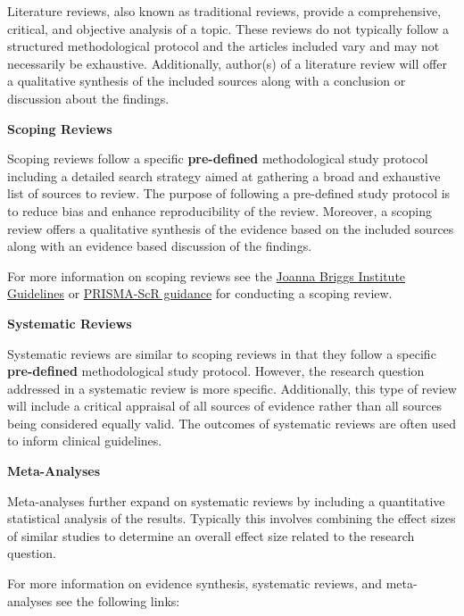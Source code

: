 \documentclass[
]{book}
\begin{document}
Literature reviews, also known as traditional reviews, provide a comprehensive, critical, and objective analysis of a topic. These reviews do not typically follow a structured methodological protocol and the articles included vary and may not necessarily be exhaustive. Additionally, author(s) of a literature review will offer a qualitative synthesis of the included sources along with a conclusion or discussion about the findings.

\textbf{Scoping Reviews}

Scoping reviews follow a specific \textbf{pre-defined} methodological study protocol including a detailed search strategy aimed at gathering a broad and exhaustive list of sources to review. The purpose of following a pre-defined study protocol is to reduce bias and enhance reproducibility of the review. Moreover, a scoping review offers a qualitative synthesis of the evidence based on the included sources along with an evidence based discussion of the findings.

For more information on scoping reviews see the \href{https://jbi-global-wiki.refined.site/space/MANUAL/4687342/Chapter+11\%3A+Scoping+reviews}{Joanna Briggs Institute Guidelines} or \href{https://www.prisma-statement.org/scoping}{PRISMA-ScR guidance} for conducting a scoping review.

\textbf{Systematic Reviews}

Systematic reviews are similar to scoping reviews in that they follow a specific \textbf{pre-defined} methodological study protocol. However, the research question addressed in a systematic review is more specific. Additionally, this type of review will include a critical appraisal of all sources of evidence rather than all sources being considered equally valid. The outcomes of systematic reviews are often used to inform clinical guidelines.

\textbf{Meta-Analyses}

Meta-analyses further expand on systematic reviews by including a quantitative statistical analysis of the results. Typically this involves combining the effect sizes of similar studies to determine an overall effect size related to the research question.

For more information on evidence synthesis, systematic reviews, and meta-analyses see the following links:
\end{document}
